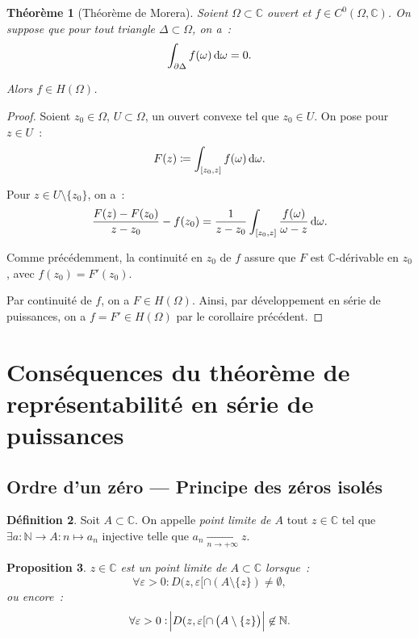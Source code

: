 \documentclass{report}
\newtheorem{thm}{Théorème}[chapter]
\newtheorem{prp}[thm]{Proposition}
\theoremstyle{definition}
\newtheorem{déf}[thm]{Définition}
\theoremstyle{remark}
\numberwithin{equation}{section}
\newcommand{\C}{\mathbb C}
\newcommand{\N}{\mathbb N}
\newcommand{\pinfty}{{+\infty}}
\begin{document}
			\begin{thm}[Théorème de Morera] Soient $\Omega \subset \C$ ouvert et $f \in C^0(\Omega, \C)$. On suppose que pour tout triangle $\Delta \subset \Omega$,
			on a~:
			\begin{equation}
				\int_{\partial \Delta} f(\omega)\dif \omega = 0.
			\end{equation}

			Alors $f \in H(\Omega)$.
			\end{thm}

			\begin{proof} Soient $z_0 \in \Omega$, $U \subset \Omega$, un ouvert convexe tel que $z_0 \in U$. On pose pour $z \in U$~:
			\begin{equation}
				F(z) \coloneqq \int_{[z_0, z]}f(\omega) \dif \omega.
			\end{equation}

			Pour $z \in U \setminus \{z_0\}$, on a~:
			\begin{equation}
				\frac {F(z) - F(z_0)}{z-z_0} - f(z_0) = \frac 1{z-z_0}\int_{[z_0, z]}\frac {f(\omega)}{\omega-z}\dif \omega.
			\end{equation}

			Comme précédemment, la continuité en $z_0$ de $f$ assure que $F$ est $\C$-dérivable en $z_0$, avec $f(z_0) = F'(z_0)$.

			Par continuité de $f$, on a $F \in H(\Omega)$. Ainsi, par développement en série de puissances, on a $f = F' \in H(\Omega)$ par le corollaire précédent.
			\end{proof}

	\section{Conséquences du théorème de représentabilité en série de puissances}
		\subsection{Ordre d'un zéro --- Principe des zéros isolés}
			\begin{déf} Soit $A \subset \C$. On appelle \textit{point limite de $A$} tout $z \in \C$ tel que $\exists a : \N \to A : n \mapsto a_n$ injective
			telle que $a_n \xrightarrow[n \to \pinfty]{} z$.
			\end{déf}

			\begin{prp} $z \in \C$ est un point limite de $A \subset \C$ lorsque~:
			\begin{equation}
				\forall \varepsilon > 0 : D(z, \varepsilon[ \cap \left(A \setminus \{z\}\right) \neq \emptyset,
			\end{equation}
			ou encore~:
			\begin{equation}
				\forall \varepsilon > 0 : \abs {D(z, \varepsilon[ \cap \left(A \setminus \{z\}\right)} \not \in \N.
			\end{equation}
			\end{prp}
\end{document}
